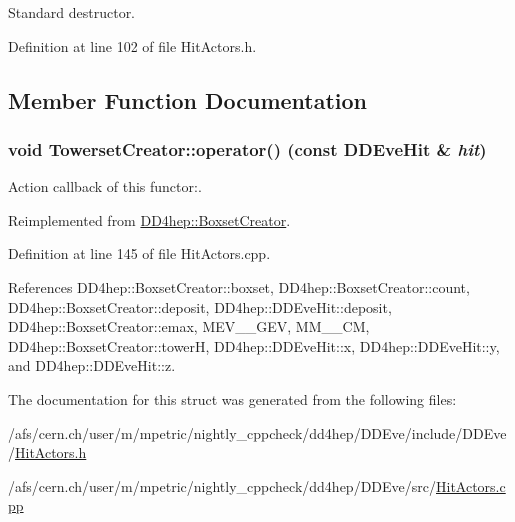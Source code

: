 Standard destructor. 

Definition at line 102 of file HitActors.h.

\subsection{Member Function Documentation}
\hypertarget{struct_d_d4hep_1_1_towerset_creator_a5afb1ff94fd502e36e56df19effe7221}{
\subsubsection[{operator()}]{\setlength{\rightskip}{0pt plus 5cm}void TowersetCreator::operator() (const {\bf DDEveHit} \& {\em hit})}}
\label{struct_d_d4hep_1_1_towerset_creator_a5afb1ff94fd502e36e56df19effe7221}


Action callback of this functor:. 

Reimplemented from \hyperlink{struct_d_d4hep_1_1_boxset_creator_a25f63197d03ad33193ac3c77207db808}{DD4hep::BoxsetCreator}.

Definition at line 145 of file HitActors.cpp.

References DD4hep::BoxsetCreator::boxset, DD4hep::BoxsetCreator::count, DD4hep::BoxsetCreator::deposit, DD4hep::DDEveHit::deposit, DD4hep::BoxsetCreator::emax, MEV\_\_\-GEV, MM\_\_\-CM, DD4hep::BoxsetCreator::towerH, DD4hep::DDEveHit::x, DD4hep::DDEveHit::y, and DD4hep::DDEveHit::z.

The documentation for this struct was generated from the following files:\begin{DoxyCompactItemize}
\item 
/afs/cern.ch/user/m/mpetric/nightly\_\-cppcheck/dd4hep/DDEve/include/DDEve/\hyperlink{_hit_actors_8h}{HitActors.h}\item 
/afs/cern.ch/user/m/mpetric/nightly\_\-cppcheck/dd4hep/DDEve/src/\hyperlink{_hit_actors_8cpp}{HitActors.cpp}\end{DoxyCompactItemize}
